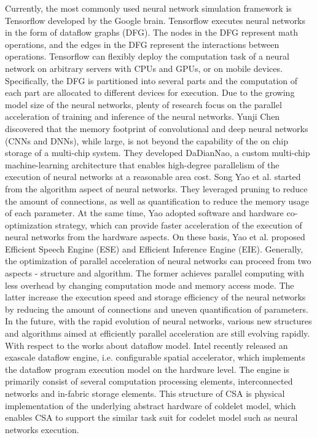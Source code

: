 Currently, the most commonly used neural network simulation framework is Tensorflow developed by the Google brain. Tensorflow executes neural networks in the form of dataflow graphs (DFG). The nodes in the DFG represent math operations, and the edges in the DFG represent the interactions between operations. Tensorflow can flexibly deploy the computation task of a neural network on arbitrary servers with CPUs and GPUs, or on mobile devices. Specifically, the DFG is partitioned into several parts and the computation of each part are allocated to different devices for execution.
Due to the growing model size of the neural networks, plenty of research focus on the parallel acceleration of training and inference of the neural networks. Yunji Chen discovered that the memory footprint of convolutional and deep neural networks (CNNs and DNNs), while large, is not beyond the capability of the on chip storage of a multi-chip system. They developed DaDianNao, a custom multi-chip machine-learning architecture that enables high-degree parallelism of the execution of neural networks at a reasonable area cost. Song Yao et al. started from the algorithm aspect of neural networks. They leveraged pruning to reduce the amount of connections, as well as quantification to reduce the memory usage of each parameter. At the same time, Yao adopted software and hardware co-optimization strategy, which can provide faster acceleration of the execution of neural networks from the hardware aspects. On these basis, Yao et al. proposed Efficient Speech Engine (ESE) and Efficient Inference Engine (EIE).
Generally, the optimization of parallel acceleration of neural networks can proceed from two aspects - structure and algorithm. The former achieves parallel computing with less overhead by changing computation mode and memory access mode. The latter increase the execution speed and storage efficiency of the neural networks by reducing the amount of connections and uneven quantification of parameters. In the future, with the rapid evolution of neural networks, various new structures and algorithms aimed at efficiently parallel acceleration are still evolving rapidly.
With respect to the works about dataflow model. Intel recently released an exascale dataflow engine, i.e. configurable spatial accelerator, which implements the dataflow program execution model on the hardware level. The engine is primarily consist of several computation processing elements, interconnected networks and in-fabric storage elements. This structure of CSA is physical implementation of the underlying abstract hardware of coldelet model, which enables CSA to support the similar task suit for codelet model such as neural networks execution.  

